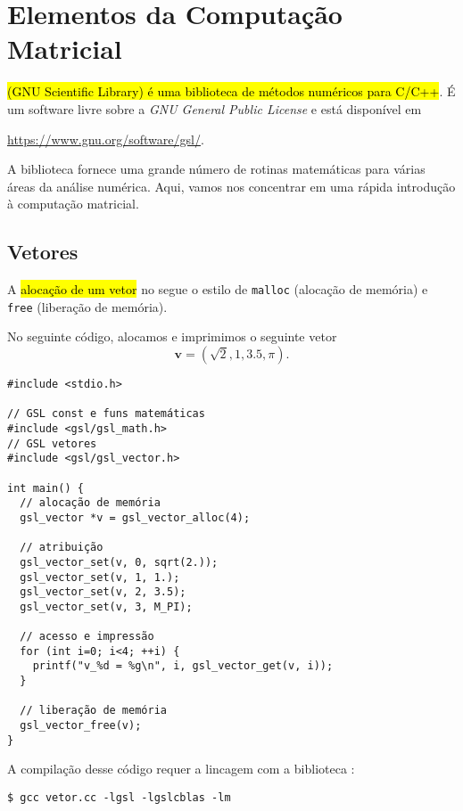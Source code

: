 \documentclass[12pt]{article}
\begin{document}
\section{Elementos da Computação Matricial}\label{sec_mat}

\hl{{\gsl} (GNU Scientific Library) é uma biblioteca de métodos numéricos para C/C++}. É um software livre sobre a \textit{GNU General Public License} e está disponível em
\begin{center}
  \url{https://www.gnu.org/software/gsl/}.
\end{center}

A biblioteca fornece uma grande número de rotinas matemáticas para várias áreas da análise numérica. Aqui, vamos nos concentrar em uma rápida introdução à computação matricial.

\subsection{Vetores}\label{sec_mat_subsec_vet}

A \hl{alocação de um vetor} no {\gsl} segue o estilo de \lstinline+malloc+ (alocação de memória) e \lstinline+free+ (liberação de memória).

\begin{ex}
  No seguinte código, alocamos e imprimimos o seguinte vetor
  \begin{equation}
    \pmb{v} = (\sqrt{2}, 1, 3.5, \pi).
  \end{equation}

\begin{lstlisting}[caption=vector.cc]
#include <stdio.h>

// GSL const e funs matemáticas
#include <gsl/gsl_math.h>
// GSL vetores
#include <gsl/gsl_vector.h>

int main() {
  // alocação de memória
  gsl_vector *v = gsl_vector_alloc(4);

  // atribuição
  gsl_vector_set(v, 0, sqrt(2.));
  gsl_vector_set(v, 1, 1.);
  gsl_vector_set(v, 2, 3.5);
  gsl_vector_set(v, 3, M_PI);

  // acesso e impressão
  for (int i=0; i<4; ++i) {
    printf("v_%d = %g\n", i, gsl_vector_get(v, i));
  }
  
  // liberação de memória
  gsl_vector_free(v);
}
\end{lstlisting}

  A compilação desse código requer a lincagem com a biblioteca {\gsl}:
\begin{lstlisting}
$ gcc vetor.cc -lgsl -lgslcblas -lm
\end{lstlisting}
\end{ex}
\end{document}
